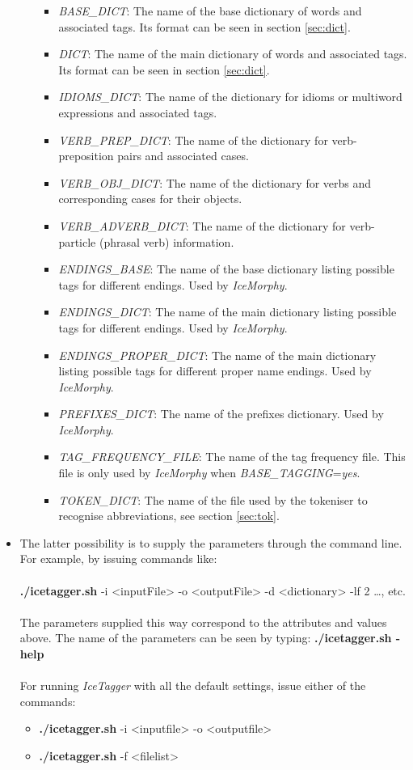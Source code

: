 \documentclass[11pt]{article}
\begin{document}
\begin{itemize}
\begin{itemize}
\begin{itemize}
\item \emph{BASE\_DICT}: The name of the base dictionary of words and associated tags. Its format can be seen in section \ref{sec:dict}.
\item \emph{DICT}: The name of the main dictionary of words and associated tags. Its format can be seen in section \ref{sec:dict}.
\item \emph{IDIOMS\_DICT}: The name of the dictionary for idioms or multiword expressions and associated tags.
\item \emph{VERB\_PREP\_DICT}: The name of the dictionary for verb-preposition pairs and associated cases.
\item \emph{VERB\_OBJ\_DICT}: The name of the dictionary for verbs and corresponding cases for their objects.
\item \emph{VERB\_ADVERB\_DICT}: The name of the dictionary for verb-particle (phrasal verb) information.
\item \emph{ENDINGS\_BASE}: The name of the base dictionary listing possible tags for different endings. Used by \textit{IceMorphy}.
\item \emph{ENDINGS\_DICT}: The name of the main dictionary listing possible tags for different endings. Used by \textit{IceMorphy}.
\item \emph{ENDINGS\_PROPER\_DICT}: The name of the main dictionary listing possible tags for different proper name endings. Used by \textit{IceMorphy}.
\item \emph{PREFIXES\_DICT}: The name of the prefixes dictionary. Used by \textit{IceMorphy}.
\item \emph{TAG\_FREQUENCY\_FILE}: The name of the tag frequency file. This file is only used by \textit{IceMorphy} when \emph{BASE\_TAGGING}=\emph{yes}.
\item \emph{TOKEN\_DICT}: The name of the file used by the tokeniser to recognise abbreviations, see section \ref{sec:tok}.
\end{itemize}
\end{itemize}
\item The latter possibility is to supply the parameters through the command line. For example, by issuing commands like: \\ \\
\textbf{./icetagger.sh} -i <inputFile> -o <outputFile> -d <dictionary> -lf 2 \ldots, etc. \\ \\
The parameters supplied this way correspond to the attributes and values above.
The name of the parameters can be seen by typing: \textbf{./icetagger.sh -help} \\ \\
For running \textit{IceTagger} with all the default settings, issue either of the commands: 
\begin{itemize} 
\item \textbf{./icetagger.sh} -i <inputfile> -o <outputfile>
\item \textbf{./icetagger.sh} -f <filelist> 
\end{itemize}


\end{itemize}
\end{document}
